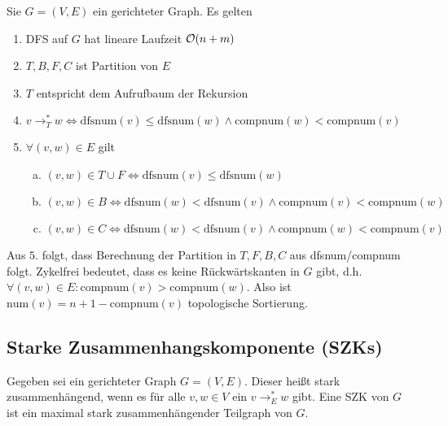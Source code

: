                         \begin{lemma}
                            Sie $G=(V,E)$ ein gerichteter Graph. Es gelten
                            \begin{enumerate}
                                \item DFS auf $G$ hat lineare Laufzeit $\mathcal{O}(n+m)$
                                \item $T,B,F,C$ ist Partition von $E$
                                \item $T$ entspricht dem Aufrufbaum der Rekursion
                                \item $v \rightarrow_T^* w \iff \text{dfsnum}(v) \leq \text{dfsnum}(w) \land \text{compnum}(w) < \text{compnum}(v)$
                                \item $\forall (v,w) \in E$ gilt
                                    \begin{enumerate}[a)]
                                        \item $(v,w) \in T \cup F \iff \text{dfsnum}(v) \leq \text{dfsnum}(w)$
                                        \item $(v,w) \in B \iff \text{dfsnum}(w) < \text{dfsnum}(v) \land \text{compnum}(v) < \text{compnum}(w)$
                                        \item $(v,w) \in C \iff \text{dfsnum}(w) < \text{dfsnum}(v) \land \text{compnum}(w) < \text{compnum}(v)$
                                    \end{enumerate}
                            \end{enumerate}
                        \end{lemma}
                        Aus $5.$ folgt, dass Berechnung der Partition in $T,F,B,C$ aus dfsnum/compnum folgt. Zykelfrei bedeutet, dass es keine Rückwärtskanten in $G$ gibt, d.h. $\forall (v,w) \in E : \text{compnum}(v) > \text{compnum}(w)$. Also ist $\text{num}(v) = n+1-\text{compnum}(v)$ topologische Sortierung.
                               
                \subsection{Starke Zusammenhangskomponente (SZKs)}
                    Gegeben sei ein gerichteter Graph $G = (V,E)$. Dieser heißt stark zusammenhängend, wenn es für alle $v,w \in V$ ein $v \rightarrow_E^* w$ gibt. Eine SZK von $G$ ist ein maximal stark zusammenhängender Teilgraph von $G$.
                    

